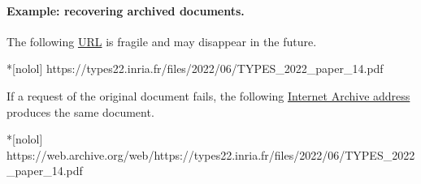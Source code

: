 \paragraph*{Example: recovering archived documents.}\mbox{}

The following \href{https://types22.inria.fr/files/2022/06/TYPES_2022_paper_14.pdf}{URL} is fragile and may disappear in the future.
\begin{center}
\begin{minipage}{\textwidth}
\begin{cmdlisting}*[nolol]
https://types22.inria.fr/files/2022/06/TYPES_2022_paper_14.pdf
\end{cmdlisting}
\end{minipage}
\end{center}

If a request of the original document fails, the following \href{https://web.archive.org/web/https://types22.inria.fr/files/2022/06/TYPES_2022_paper_14.pdf}{Internet Archive address} produces the same document.
\begin{center}
\begin{minipage}{\textwidth}
\begin{cmdlisting}*[nolol]
https://web.archive.org/web/https://types22.inria.fr/files/2022/06/TYPES_2022_paper_14.pdf
\end{cmdlisting}
\end{minipage}
\end{center}